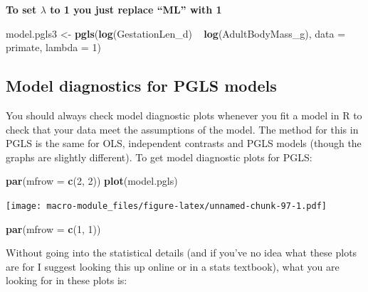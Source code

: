 \documentclass[]{book}
\newenvironment{Shaded}{\begin{snugshade}}{\end{snugshade}}
\newcommand{\KeywordTok}[1]{\textcolor[rgb]{0.13,0.29,0.53}{\textbf{{#1}}}}
\newcommand{\DataTypeTok}[1]{\textcolor[rgb]{0.13,0.29,0.53}{{#1}}}
\newcommand{\DecValTok}[1]{\textcolor[rgb]{0.00,0.00,0.81}{{#1}}}
\newcommand{\StringTok}[1]{\textcolor[rgb]{0.31,0.60,0.02}{{#1}}}
\newcommand{\NormalTok}[1]{{#1}}
\begin{document}
\textbf{To set \(\lambda\) to 1 you just replace ``ML'' with 1}

\begin{Shaded}
\begin{Highlighting}[]
\NormalTok{model.pgls3 <-}\StringTok{ }\KeywordTok{pgls}\NormalTok{(}\KeywordTok{log}\NormalTok{(GestationLen_d) ~}\StringTok{ }\KeywordTok{log}\NormalTok{(AdultBodyMass_g), }\DataTypeTok{data =} \NormalTok{primate, }\DataTypeTok{lambda =} \DecValTok{1}\NormalTok{)}
\end{Highlighting}
\end{Shaded}

\subsection{Model diagnostics for PGLS
models}\label{model-diagnostics-for-pgls-models}

You should always check model diagnostic plots whenever you fit a model
in R to check that your data meet the assumptions of the model. The
method for this in PGLS is the same for OLS, independent contrasts and
PGLS models (though the graphs are slightly different). To get model
diagnostic plots for PGLS:

\begin{Shaded}
\begin{Highlighting}[]
\KeywordTok{par}\NormalTok{(}\DataTypeTok{mfrow =} \KeywordTok{c}\NormalTok{(}\DecValTok{2}\NormalTok{, }\DecValTok{2}\NormalTok{))}
\KeywordTok{plot}\NormalTok{(model.pgls)}
\end{Highlighting}
\end{Shaded}

\texttt{[image: macro-module\_files/figure-latex/unnamed-chunk-97-1.pdf]}

\begin{Shaded}
\begin{Highlighting}[]
\KeywordTok{par}\NormalTok{(}\DataTypeTok{mfrow =} \KeywordTok{c}\NormalTok{(}\DecValTok{1}\NormalTok{, }\DecValTok{1}\NormalTok{))}
\end{Highlighting}
\end{Shaded}

Without going into the statistical details (and if you've no idea what
these plots are for I suggest looking this up online or in a stats
textbook), what you are looking for in these plots is:
\end{document}
